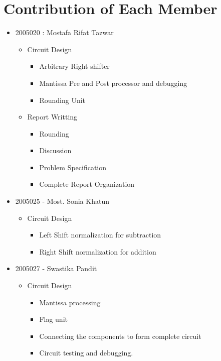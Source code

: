 \documentclass[18pt]{article}
\begin{document}
\section{Contribution of Each Member}
\begin{itemize}
    \item 2005020 : Mostafa Rifat Tazwar 
    \begin{itemize}
        \item Circuit Design
        \begin{itemize}
            \item Arbitrary Right shifter
            \item Mantissa Pre and Post processor and debugging
            \item Rounding Unit
        \end{itemize}
        \item Report Writting
        \begin{itemize}
        \item Rounding
            \item Discussion
            \item Problem Specification
            \item Complete Report Organization
        \end{itemize}
    \end{itemize}
    \item 2005025 - Most. Sonia Khatun
    \begin{itemize}
        \item Circuit Design
        \begin{itemize}
        \item Left Shift normalization for subtraction  \item Right Shift normalization for addition
        \end{itemize}
    \end{itemize}
    \item 2005027 - Swastika Pandit
    \begin{itemize}
        \item Circuit Design
        \begin{itemize}
        \item Mantissa processing \item Flag unit \item Connecting the components to form complete circuit \item Circuit testing and debugging. 
        \end{itemize}

\end{itemize}
\end{itemize}
\end{document}
